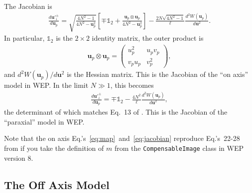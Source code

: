 \documentclass[TS,authoryear,toc]{lsstdoc}
\begin{document}
The Jacobian is
\begin{align}
    \frac{d\mathbf{u'}_{\!i}^\pm}{d\mathbf{u}_p} = 
    \sqrt{\frac{4N^2 - 1}{4N^2 - \mathbf{u}_p^2}} \left[
        \mp \mathds{1}_2 + \frac{\mathbf{u}_p \otimes \mathbf{u}_p}{4N^2 - \mathbf{u}_p^2}
    \right] - \frac{2N \sqrt{4N^2 - 1}}{\ell} \frac{d^2 W(\mathbf{u}_p)}{d \mathbf{u}^2}.
    \label{eq:jacobian}
\end{align}
In particular, $\mathds{1}_2$ is the $2 \times 2$ identity matrix, the outer product is
\begin{align}
    \mathbf{u}_p \otimes \mathbf{u}_p = 
    \begin{pmatrix}
        u_p^2   & u_p v_p \\
        v_p u_p & v_p^2
    \end{pmatrix},
\end{align}
and $d^2 W(\mathbf{u}_p) / d \mathbf{u}^2$ is the Hessian matrix.
This is the Jacobian of the ``on axis'' model in WEP.
In the limit $N \gg 1$, this becomes
\begin{align}
    \frac{d\mathbf{u'}_{\!i}^\pm}{d\mathbf{u}_p} = \mp \mathds{1}_2 - \frac{4 N^2}{\ell} \frac{d^2 W(\mathbf{u}_p)}{d \mathbf{u}^2},
\end{align}
the determinant of which matches Eq.~13 of \citet{1993JOSAA..10.2277R}.
This is the Jacobian of the ``paraxial'' model in WEP.

Note that the on axis Eq.'s~\ref{eq:map}~and~\ref{eq:jacobian} reproduce Eq.'s~22-28 from \citet{2015ApOpt..54.9045X} if you take the definition of $m$ from the \texttt{CompensableImage} class in WEP version 8.

\subsection{The Off Axis Model}
\label{sec:off-axis}
\end{document}
